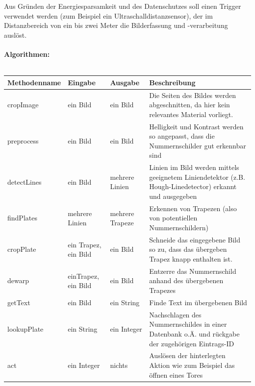 \documentclass{../Vorlage/sebDenCls}
\begin{document}
Aus Gründen der Energiesparsamkeit und des Datenschutzes soll einen Trigger verwendet werden (zum Beispiel ein Ultraschalldistanzsensor), der im Distanzbereich von ein bis zwei Meter die Bilderfassung und -verarbeitung auslöst.\\
\\
\textbf{Algorithmen:}\\\\
\begin{longtable}{lllp{4cm}}
\textbf{Methodenname} & \textbf{Eingabe} & \textbf{Ausgabe} & \textbf{Beschreibung}\\
\hline
cropImage & ein Bild & ein Bild & Die Seiten des Bildes werden abgeschnitten, da hier kein relevantes Material vorliegt.\\\hline
preprocess & ein Bild & ein Bild & Helligkeit und Kontrast werden so angepasst, dass die Nummernschilder gut erkennbar sind\\\hline
detectLines & ein Bild & mehrere Linien & Linien im Bild werden mittels geeignetem Liniendetektor (z.B. Hough-Linedetector) erkannt und ausgegeben\\\hline
findPlates & mehrere Linien & mehrere Trapeze & Erkennen von Trapezen (also von potentiellen Nummernschildern)\\\hline
cropPlate & ein Trapez, ein Bild & ein Bild & Schneide das eingegebene Bild so zu, dass das übergeben Trapez knapp enthalten ist.\\\hline
dewarp & einTrapez, ein Bild & ein Bild & Entzerre das Nummernschild anhand des übergebenen Trapezes\\\hline
getText & ein Bild & ein String & Finde Text im übergebenen Bild\\\hline
lookupPlate & ein String & ein Integer & Nachschlagen des Nummernschildes in einer Datenbank o.Ä. und rückgabe der zugehörigen Eintrags-ID\\\hline
act & ein Integer & nichts & Auslösen der hinterlegten Aktion wie zum Beispiel das öffnen eines Tores\\

\end{longtable}
\end{document}
